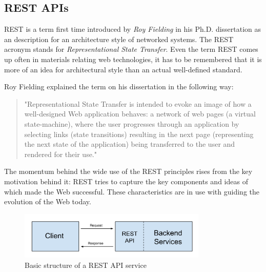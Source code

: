 \subsection{REST APIs}

REST is a term first time introduced by \textit{Roy Fielding} in his Ph.D. dissertation \cite{fielding_architectural_2000} as an description for an architecture style of networked systems. The REST acronym stands for \textit{Representational State Transfer}. Even the term REST comes up often in materials relating web technologies, it has to be remembered that it is more of an idea for architectural style than an actual well-defined standard. 

Roy Fielding explained the term on his dissertation in the following way:
\begin{quote}
"Representational State Transfer is intended to evoke an image of how a well-designed Web application behaves: a network of web pages (a virtual state-machine), where the user progresses through an application by selecting links (state transitions) resulting in the next page (representing the next state of the application) being transferred to the user and rendered for their use."
\end{quote}

The momentum behind the wide use of the REST principles rises from the key motivation behind it: REST tries to capture the key components and ideas of which made the Web successful. These characteristics are in use with guiding the evolution of the Web today. \cite{costello_building_2007}

\begin{figure}[t]
\begin{center}
\includegraphics[width=0.8\textwidth]{assets/restapi.png}
\end{center}
\caption{Basic structure of a REST API service}
\label{fig:restapi}
\end{figure}

